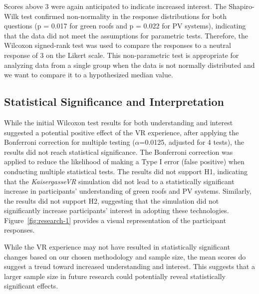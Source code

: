 \documentclass[draft, final]{vutinfth} %
\begin{document}
Scores above 3 were again anticipated to indicate increased interest. The Shapiro-Wilk test confirmed non-normality in the response distributions for both questions (p = 0.017 for green roofs and p = 0.022 for PV systems), indicating that the data did not meet the assumptions for parametric tests. Therefore, the Wilcoxon signed-rank test was used to compare the responses to a neutral response of 3 on the Likert scale. This non-parametric test is appropriate for analyzing data from a single group when the data is not normally distributed and we want to compare it to a hypothesized median value.

\subsection{Statistical Significance and Interpretation}

While the initial Wilcoxon test results for both understanding and interest suggested a potential positive effect of the VR experience, after applying the Bonferroni correction for multiple testing ($\alpha$=0.0125, adjusted for 4 tests), the results did not reach statistical significance. The Bonferroni correction was applied to reduce the likelihood of making a Type I error (false positive) when conducting multiple statistical tests. The results did not support H1, indicating that the \textit{KaisergasseVR} simulation did not lead to a statistically significant increase in participants' understanding of green roofs and PV systems. Similarly, the results did not support H2, suggesting that the simulation did not significantly increase participants' interest in adopting these technologies. Figure~\ref{fig:research-1} provides a visual representation of the participant responses.

While the VR experience may not have resulted in statistically significant changes based on our chosen methodology and sample size, the mean scores do suggest a trend toward increased understanding and interest. This suggests that a larger sample size in future research could potentially reveal statistically significant effects.
\end{document}
